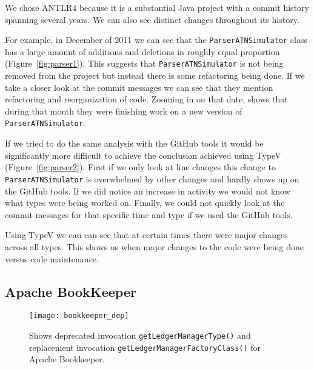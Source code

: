 We chose ANTLR4 because it is a substantial Java project with a commit history spanning several years. We can also see distinct changes throughout its history.

For example, in December of 2011 we can see that the \texttt{ParserATNSimulator} class has a large amount of additions and deletions in roughly equal proportion (Figure~\ref{fig:parser1}). This suggests that \texttt{ParserATNSimulator} is not being removed from the project but instead there is some refactoring being done. If we take a closer look at the commit messages we can see that they mention refactoring and reorganization of code. Zooming in on that date,  shows that during that month they were finishing work on a new version of \texttt{ParserATNSimulator}.

If we tried to do the same analysis with the GitHub tools it would be significantly more difficult to achieve the conclusion achieved using TypeV (Figure~\ref{fig:parser2}). First if we only look at line changes this change to \texttt{ParserATNSimulator} is overwhelmed by other changes and hardly shows up on the GitHub tools. If we did notice an increase in activity we would not know what types were being worked on. Finally, we could not quickly look at the commit messages for that specific time and type if we used the GitHub tools.

Using TypeV we can can see that at certain times there were major changes across all types. This shows us when major changes to the code were being done versus code maintenance.

\subsection{Apache BookKeeper}

\begin{figure}[!ht]
\centering
\texttt{[image: bookkeeper\_dep]}
\caption{Shows deprecated invocation \texttt{getLedgerManagerType()} and replacement invocation \texttt{getLedgerManagerFactoryClass()} for Apache Bookkeeper.}
\label{fig:bookkeeper-depr}
\end{figure}

